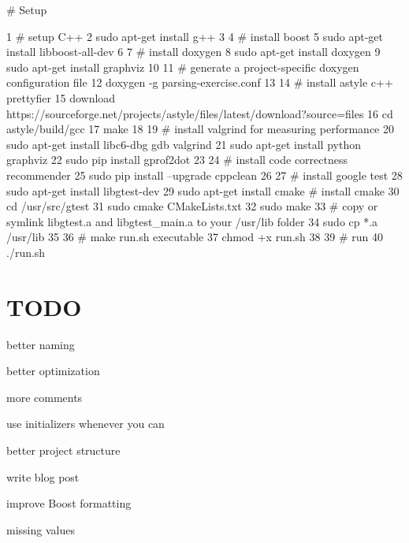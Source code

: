 \# Setup 
\begin{DoxyCode}
1 # setup C++
2 sudo apt-get install g++
3 
4 # install boost
5 sudo apt-get install libboost-all-dev
6 
7 # install doxygen
8 sudo apt-get install doxygen
9 sudo apt-get install graphviz
10 
11 # generate a project-specific doxygen configuration file
12 doxygen -g parsing-exercise.conf
13 
14 # install astyle c++ prettyfier
15 download https://sourceforge.net/projects/astyle/files/latest/download?source=files
16 cd astyle/build/gcc
17 make
18 
19 # install valgrind for measuring performance
20 sudo apt-get install libc6-dbg gdb valgrind
21 sudo apt-get install python graphviz
22 sudo pip install gprof2dot
23 
24 # install code correctness recommender
25 sudo pip install --upgrade cppclean
26 
27 # install google test
28 sudo apt-get install libgtest-dev
29 sudo apt-get install cmake # install cmake
30 cd /usr/src/gtest
31 sudo cmake CMakeLists.txt
32 sudo make
33 # copy or symlink libgtest.a and libgtest\_main.a to your /usr/lib folder
34 sudo cp *.a /usr/lib
35 
36 # make run.sh executable
37 chmod +x run.sh
38 
39 # run
40 ./run.sh
\end{DoxyCode}


\section*{T\+O\+DO}


\begin{DoxyItemize}
\item better naming
\item better optimization
\item more comments
\item use initializers whenever you can
\item better project structure
\item write blog post
\item improve Boost formatting
\item missing values 
\end{DoxyItemize}